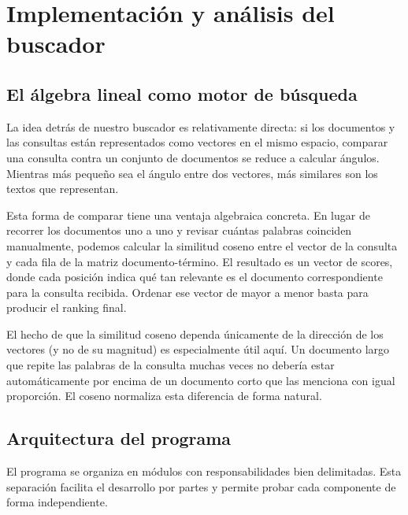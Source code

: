 \documentclass[12pt,a4paper]{article}
\begin{document}
\newpage
\section{Implementación y análisis del buscador}

\subsection{El álgebra lineal como motor de búsqueda}

La idea detrás de nuestro buscador es relativamente directa: si los documentos y las consultas están representados como vectores en el mismo espacio, comparar una consulta contra un conjunto de documentos se reduce a calcular ángulos. Mientras más pequeño sea el ángulo entre dos vectores, más similares son los textos que representan.

Esta forma de comparar tiene una ventaja algebraica concreta. En lugar de recorrer los documentos uno a uno y revisar cuántas palabras coinciden manualmente, podemos calcular la similitud coseno entre el vector de la consulta y cada fila de la matriz documento-término. El resultado es un vector de scores, donde cada posición indica qué tan relevante es el documento correspondiente para la consulta recibida. Ordenar ese vector de mayor a menor basta para producir el ranking final.

El hecho de que la similitud coseno dependa únicamente de la dirección de los vectores (y no de su magnitud) es especialmente útil aquí. Un documento largo que repite las palabras de la consulta muchas veces no debería estar automáticamente por encima de un documento corto que las menciona con igual proporción. El coseno normaliza esta diferencia de forma natural.

\subsection{Arquitectura del programa}

El programa se organiza en módulos con responsabilidades bien delimitadas. Esta separación facilita el desarrollo por partes y permite probar cada componente de forma independiente.
\end{document}
